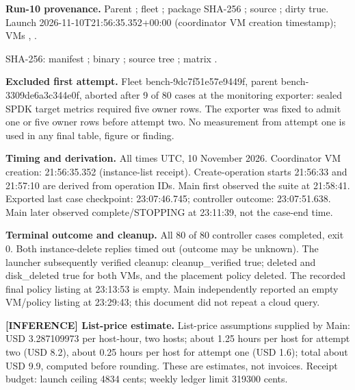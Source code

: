 \textbf{Run-10 provenance.} Parent ; fleet ; package SHA-256 ; source ; dirty true. Launch 2026-11-10T21:56:35.352+00:00 (coordinator VM creation timestamp); VMs , .

SHA-256: manifest ; binary ; source tree ; matrix .

\textbf{Excluded first attempt.} Fleet bench-9dc7f51e57e9449f, parent bench-3309de6a3c344e0f, aborted after 9 of 80 cases at the monitoring exporter: sealed SPDK target metrics required five owner rows. The exporter was fixed to admit one or five owner rows before attempt two. No measurement from attempt one is used in any final table, figure or finding.

\textbf{Timing and derivation.} All times UTC, 10 November 2026. Coordinator VM creation: 21:56:35.352 (instance-list receipt). Create-operation starts 21:56:33 and 21:57:10 are derived from operation IDs. Main first observed the suite at 21:58:41. Exported last case checkpoint: 23:07:46.745; controller outcome: 23:07:51.638. Main later observed complete/STOPPING at 23:11:39, not the case-end time.

\textbf{Terminal outcome and cleanup.} All 80 of 80 controller cases completed, exit 0. Both instance-delete replies timed out (outcome may be unknown). The launcher subsequently verified cleanup: cleanup\_verified true; deleted and disk\_deleted true for both VMs, and the placement policy deleted. The recorded final policy listing at 23:13:53 is empty. Main independently reported an empty VM/policy listing at 23:29:43; this document did not repeat a cloud query.

\textbf{[INFERENCE] List-price estimate.} List-price assumptions supplied by Main: USD 3.287109973 per host-hour, two hosts; about 1.25 hours per host for attempt two (USD 8.2), about 0.25 hours per host for attempt one (USD 1.6); total about USD 9.9, computed before rounding. These are estimates, not invoices. Receipt budget: launch ceiling 4834 cents; weekly ledger limit 319300 cents.
